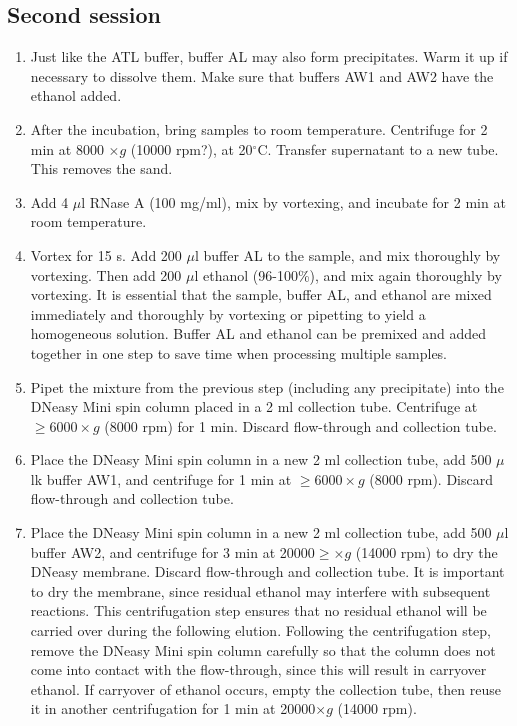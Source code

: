 \documentclass[a4paper,12pt]{article}
\begin{document}
\subsection{Second session}
\begin{enumerate}
\item Just like the ATL buffer, buffer AL may also form precipitates. Warm it up if necessary to dissolve them. Make sure that buffers AW1 and AW2 have the ethanol added.
\item After the incubation, bring samples to room temperature. Centrifuge for 2 min at 8000 $\times g$ (10000 rpm?), at 20$^\circ$C. Transfer supernatant to a new tube. This removes the sand.
\item Add 4 $\mu$l RNase A (100 mg/ml), mix by vortexing, and incubate for 2 min at room temperature.
\item Vortex for 15 s. Add 200 $\mu$l buffer AL to the sample, and mix thoroughly by vortexing. Then add 200 $\mu$l ethanol (96-100\%), and mix again thoroughly by vortexing. It is essential that the sample, buffer AL, and ethanol are mixed immediately and thoroughly by vortexing or pipetting to yield a homogeneous solution. Buffer AL and ethanol can be premixed and added together in one step to save time when processing multiple samples.
\item Pipet the mixture from the previous step (including any precipitate) into the DNeasy Mini spin column placed in a 2 ml collection tube. Centrifuge at $\geq6000 \times g$ (8000 rpm) for 1 min. Discard flow-through and collection tube. 
\item Place the DNeasy Mini spin column in a new 2 ml collection tube, add 500 $\mu$lk buffer AW1, and centrifuge for 1 min at $\geq6000 \times g$ (8000 rpm). Discard flow-through and collection tube.
\item Place the DNeasy Mini spin column in a new 2 ml collection tube, add 500 $\mu$l buffer AW2, and centrifuge for 3 min at 20000$\geq \times g$ (14000 rpm) to dry the DNeasy membrane. Discard flow-through and collection tube. It is important to dry the membrane, since residual ethanol may interfere with subsequent reactions. This centrifugation step ensures that no residual ethanol will be carried over during the following elution. Following the centrifugation step, remove the DNeasy Mini spin column carefully so that the column does not come into contact with the flow-through, since this will result in carryover ethanol. If carryover of ethanol occurs, empty the collection tube, then reuse it in another centrifugation for 1 min at 20000$\times g$ (14000 rpm).

\end{enumerate}
\end{document}
